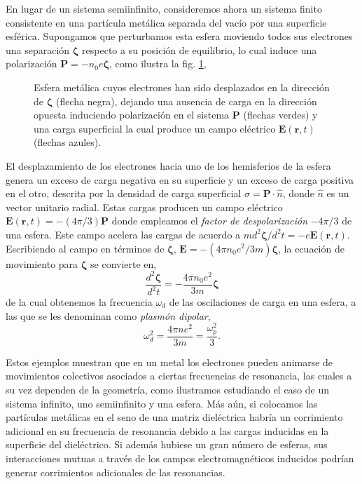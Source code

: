 \documentclass[12pt]{article}
\begin{document}
En lugar de un sistema semiinfinito, consideremos ahora un sistema
finito consistente en una partícula metálica separada del vacío por
una superficie esférica. Supongamos que perturbamos esta esfera
moviendo todos sus electrones una separación $\bm{\zeta}$ respecto a
su posición de equilibrio, lo cual induce una polarización
$\bm{P}=-n_0 e\bm \zeta$, como ilustra la fig. \ref{Polariton},
\begin{figure}
  \centering
  
  \caption{Esfera metálica cuyos electrones han sido desplazados en la
    dirección de $\bm{\zeta}$ (flecha negra), dejando una ausencia de
    carga en la dirección opuesta induciendo polarización en el
    sistema $\bm P$ (flechas verdes) y una carga
    superficial la cual produce un campo eléctrico
    $\bm{E}(\bm{r},t)$ (flechas azules).}
\label{Polariton}

\end{figure}
El desplazamiento de los electrones hacia uno de los hemisferios de la
esfera genera un exceso de carga negativa en su superficie y un exceso
de carga positiva en el otro, descrita por la densidad de carga
superficial $\sigma=\bm{P}\cdot\hat n$, donde $\hat n$ es un
vector unitario radial. Estas cargas producen un campo eléctrico
$\bm{E}(\bm{r},t) = -(4\pi/3)\bm{P} $ donde empleamos el
{\em factor de despolarización} $-4\pi/3$ de una esfera. Este campo
acelera las cargas de acuerdo a
$md^{2}\bm\zeta/d^{2}t=-e\bm{E}(\bm{r},t)$. Escribiendo al
campo en términos de $\bm\zeta$,
$\bm{E}= -(4\pi n_0 e^{2}/3m)\bm{\zeta}$, la ecuación de movimiento
para $\bm{\zeta}$ se convierte en,
\begin{equation}
  \frac{d^{2}\bm{\zeta}}{d^{2}t}= -\frac{4\pi n_0 e^{2}}{3m}\bm{\zeta}
  \label{polaritondifec}
\end{equation}
de la cual obtenemos la frecuencia $\omega_d$ de las oscilaciones de carga en una
esfera, a las que se les denominan como {\em plasmón dipolar},
\begin{equation}
  \omega_{d}^{2} = \frac{4\pi n e^{2}}{3m} = \frac{\omega^2_{p}}{3}.
\end{equation}

Estos ejemplos muestran que en un metal los electrones pueden animarse
de movimientos colectivos asociados a ciertas frecuencias de
resonancia, las cuales a su vez dependen de la geometría, como
ilustramos estudiando el caso de un sistema infinito, uno semiinfinito
y una esfera. Más aún, si colocamos las partículas metálicas en el
seno de una matriz dieléctrica habría un corrimiento adicional en su
frecuencia de resonancia debido a las cargas inducidas en la
superficie del dieléctrico. Si además hubiese un gran número de
esferas, sus interacciones mutuas a través de los campos
electromagnéticos inducidos podrían generar corrimientos adicionales
de las resonancias.
\end{document}
